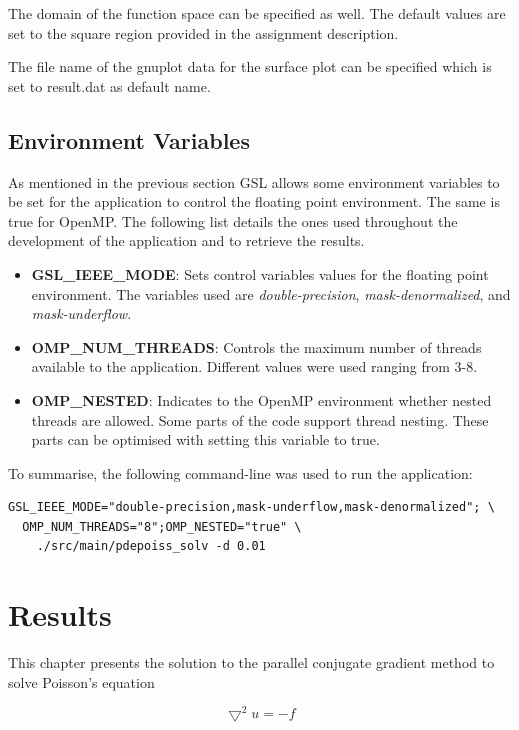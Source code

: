 \documentclass[12pt,a4paper]{report}
\begin{document}
The domain of the function space can be specified as well. The default
values are set to the square region provided in the assignment
description.

The file name of the gnuplot data for the surface plot can be
specified which is set to result.dat as default name.

\section{Environment Variables}
\label{sec:envir-vari}

As mentioned in the previous section GSL allows some environment
variables to be set for the application to control the floating point
environment. The same is true for OpenMP. The following list details
the ones used throughout the development of the application and to
retrieve the results.

\begin{itemize}
\item \textbf{GSL\_IEEE\_MODE}: Sets control variables values for the
  floating point environment. The variables used are
  \textit{double-precision}, \textit{mask-denormalized}, and
  \textit{mask-underflow}.
\item \textbf{OMP\_NUM\_THREADS}: Controls the maximum number of threads
  available to the application. Different values were used ranging
  from 3-8.
\item \textbf{OMP\_NESTED}: Indicates to the OpenMP environment whether
  nested threads are allowed. Some parts of the code support thread
  nesting. These parts can be optimised with setting this variable to
  true.
\end{itemize}

To summarise, the following command-line was used to run the
application:

\begin{verbatim}
GSL_IEEE_MODE="double-precision,mask-underflow,mask-denormalized"; \
  OMP_NUM_THREADS="8";OMP_NESTED="true" \
    ./src/main/pdepoiss_solv -d 0.01
\end{verbatim}

\chapter{Results}
\label{cha:results}

This chapter presents the solution to the parallel conjugate gradient
method to solve Poisson's equation

\begin{equation}
  \label{eq:poisson}
  \bigtriangledown^{2}u=-f
\end{equation}
\end{document}
